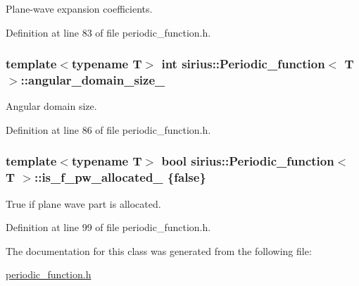 Plane-\/wave expansion coefficients. 



Definition at line 83 of file periodic\+\_\+function.\+h.

\hypertarget{classsirius_1_1_periodic__function_ad81954b5a43ca99654a19c0437579f82}{}
\subsubsection[{angular\+\_\+domain\+\_\+size\+\_\+}]{\setlength{\rightskip}{0pt plus 5cm}template$<$typename T$>$ int {\bf sirius\+::\+Periodic\+\_\+function}$<$ T $>$\+::angular\+\_\+domain\+\_\+size\+\_\+\hspace{0.3cm}{\ttfamily [private]}}\label{classsirius_1_1_periodic__function_ad81954b5a43ca99654a19c0437579f82}


Angular domain size. 



Definition at line 86 of file periodic\+\_\+function.\+h.

\hypertarget{classsirius_1_1_periodic__function_aa7ee96ee3db228d74823a3c2f8b0dfe0}{}
\subsubsection[{is\+\_\+f\+\_\+pw\+\_\+allocated\+\_\+}]{\setlength{\rightskip}{0pt plus 5cm}template$<$typename T$>$ bool {\bf sirius\+::\+Periodic\+\_\+function}$<$ T $>$\+::is\+\_\+f\+\_\+pw\+\_\+allocated\+\_\+ \{false\}\hspace{0.3cm}{\ttfamily [private]}}\label{classsirius_1_1_periodic__function_aa7ee96ee3db228d74823a3c2f8b0dfe0}


True if plane wave part is allocated. 



Definition at line 99 of file periodic\+\_\+function.\+h.



The documentation for this class was generated from the following file\+:\begin{DoxyCompactItemize}
\item 
\hyperlink{periodic__function_8h}{periodic\+\_\+function.\+h}\end{DoxyCompactItemize}
